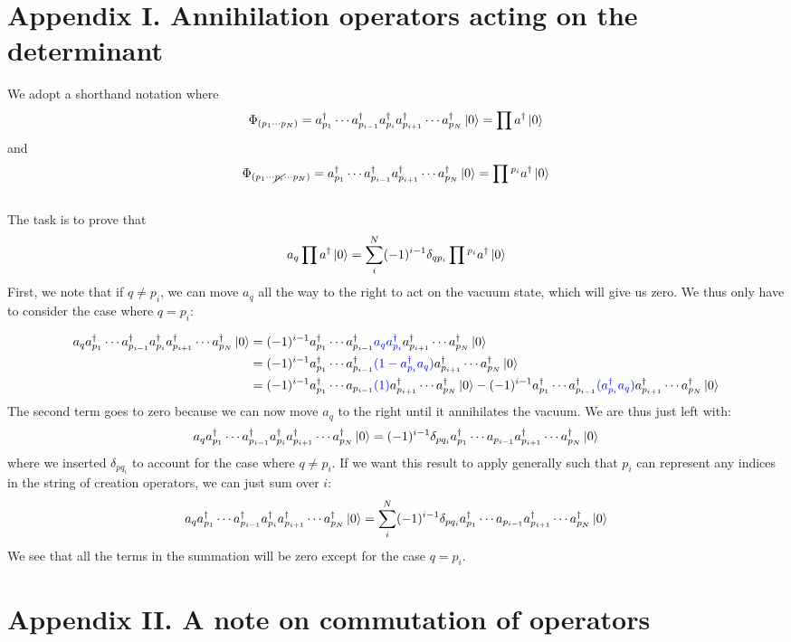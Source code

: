 \documentclass{article}
\newcommand{\dg}{\ensuremath{^\dagger} }
\newcommand{\cd}{\ensuremath{\cdots} }
\begin{document}
\section*{Appendix I. Annihilation operators acting on the determinant} 

We adopt a shorthand notation where 
\[\Phi_{(p_1\cd p_N)}  = a_{p_1}\dg \cd a_{p_{i -1}}\dg a_{p_i}\dg a_{p_{i +1}}\dg \cd a_{p_N}\dg \ket{0} = \prod a\dg \ket{0}\]
and 
\[ \Phi_{(p_1\cd\cancel{p_i}\cd p_N)} = a_{p_1}\dg \cd a_{p_{i -1}}\dg a_{p_{i +1}}\dg \cd a_{p_N}\dg \ket{0} =  \prod{}^{p_i} a\dg \ket{0} \]
\\
The task is to prove that 
\[a_q \prod a\dg \ket{0} =  \sum_i^N (-1)^{i-1} \delta_{qp_i} \prod{}^{p_i} a\dg \ket{0} \]
First, we note that if $ q \neq p_i $, we can move $a_q$ all the way to the right to act on the vacuum state, which will give us zero.
We thus only have to consider the case where  $q = p_i$: 

\begin{align*}
a_q a_{p_1}\dg \cd a_{p_{i -1}}\dg a_{p_i}\dg a_{p_{i +1}}\dg \cd a_{p_N}\dg \ket{0} &= (-1)^{i-1} a_{p_1}\dg \cd a_{p_{i -1}}\dg {\color{blue} a_q a_{p_i}\dg} a_{p_{i +1}}\dg \cd a_{p_N}\dg \ket{0}  \\
&=  (-1)^{i-1} a_{p_1}\dg \cd a_{p_{i -1}}\dg {\color{blue} (1 - a_{p_i}\dg a_q) } a_{p_{i +1}}\dg \cd a_{p_N}\dg \ket{0}  \\
&=  (-1)^{i-1} a_{p_1}\dg \cd a_{p_{i -1}} {\color{blue} (1) }  a_{p_{i +1}}\dg \cd a_{p_N}\dg \ket{0}  - (-1)^{i-1}a_{p_1}\dg \cd a_{p_{i -1}}\dg {\color{blue} (a_{p_i}\dg a_q) } a_{p_{i +1}}\dg \cd a_{p_N}\dg \ket{0} 
\end{align*}
The second term goes to zero because we can now move $a_q$ to the right until it annihilates the vacuum.
We are thus just left with: 
\[a_q a_{p_1}\dg \cd a_{p_{i -1}}\dg a_{p_i}\dg a_{p_{i +1}}\dg \cd a_{p_N}\dg \ket{0}  = (-1)^{i-1}  \delta_{pq_i} a_{p_1}\dg \cd a_{p_{i -1}} a_{p_{i +1}}\dg \cd a_{p_N}\dg \ket{0} \]
where we inserted $ \delta_{pq_i}$ to account for the case where $q \neq p_i$. 
If we want this result to apply generally such that $p_i$ can represent any indices in the string of creation operators, we can just sum over $i$: 
\[a_q a_{p_1}\dg \cd a_{p_{i -1}}\dg a_{p_i}\dg a_{p_{i +1}}\dg \cd a_{p_N}\dg \ket{0}  = \sum_i^{N} (-1)^{i-1}  \delta_{pq_i} a_{p_1}\dg \cd a_{p_{i -1}} a_{p_{i +1}}\dg \cd a_{p_N}\dg \ket{0} \]
We see that all the terms in the summation will be zero except for the case $q = p_i$. 

\section*{Appendix II. A note on commutation of operators}
\end{document}
